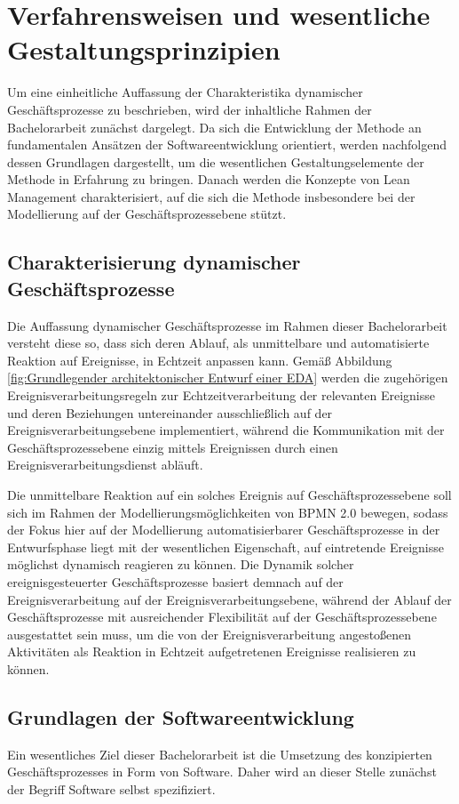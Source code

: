 \section{Verfahrensweisen und wesentliche Gestaltungsprinzipien}\label{sec:methodenGrundlage}
Um eine einheitliche Auffassung der Charakteristika dynamischer Geschäftsprozesse zu beschrieben, wird der inhaltliche Rahmen der Bachelorarbeit zunächst dargelegt.
Da sich die Entwicklung der Methode an fundamentalen Ansätzen der Softwareentwicklung orientiert, werden nachfolgend dessen Grundlagen dargestellt, um die wesentlichen Gestaltungselemente der Methode in Erfahrung zu bringen. Danach werden die Konzepte von Lean Management charakterisiert, auf die sich die Methode insbesondere bei der Modellierung auf der Geschäftsprozessebene stützt.

\subsection{Charakterisierung dynamischer Geschäftsprozesse}
Die Auffassung dynamischer Geschäftsprozesse im Rahmen dieser Bachelorarbeit versteht diese so, dass sich deren Ablauf, als unmittelbare und automatisierte Reaktion auf Ereignisse, in Echtzeit anpassen kann. Gemäß Abbildung \ref{fig:Grundlegender architektonischer Entwurf einer EDA} werden die zugehörigen Ereignisverarbeitungsregeln zur Echtzeitverarbeitung der relevanten Ereignisse und deren Beziehungen untereinander ausschließlich auf der Ereignisverarbeitungsebene implementiert, während die Kommunikation mit der Geschäftsprozessebene einzig mittels Ereignissen durch einen Ereignisverarbeitungsdienst abläuft.
\cite{Vidackovic.2014}

Die unmittelbare Reaktion auf ein solches Ereignis auf Geschäftsprozessebene soll sich im Rahmen der Modellierungsmöglichkeiten von \ac{BPMN} 2.0 bewegen, sodass der Fokus hier auf der Modellierung automatisierbarer Geschäftsprozesse in der Entwurfsphase liegt mit der wesentlichen Eigenschaft, auf eintretende Ereignisse möglichst dynamisch reagieren zu können. Die Dynamik solcher ereignisgesteuerter Geschäftsprozesse basiert demnach auf der Ereignisverarbeitung auf der Ereignisverarbeitungsebene, während der Ablauf der Geschäftsprozesse mit ausreichender Flexibilität auf der Geschäftsprozessebene ausgestattet sein muss, um die von der Ereignisverarbeitung angestoßenen Aktivitäten als Reaktion in Echtzeit aufgetretenen Ereignisse realisieren zu können.

\subsection{Grundlagen der Softwareentwicklung}
Ein wesentliches Ziel dieser Bachelorarbeit ist die Umsetzung des konzipierten Geschäftsprozesses in Form von Software. Daher wird an dieser Stelle zunächst der Begriff Software selbst spezifiziert.

